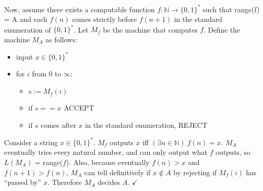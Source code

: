 \documentclass[11pt]{article}
\let\imp\rightarrow
\begin{document}
Now, assume there exists a computable function $f: \mathbb{N} \imp \{0,1\}^*$ such that range(f) = A and each $f(n)$ comes strictly before $f(n+1)$ in the standard enumeration of $\{0,1\}^*$.
Let $M_f$ be the machine that computes $f$.
Define the machine $M_A$ as follows:
\begin{itemize}
	\item input $x \in \{0,1\}^*$
	\item for $i$ from 0 to $\infty$:
	\begin{itemize}
		\item $s := M_f(i)$
		\item if $s == x$ ACCEPT
		\item if $s$ comes after $x$ in the standard enumeration, REJECT
	\end{itemize}
\end{itemize}

Consider a string $x \in \{0,1\}^*$.
$M_f$ outputs $x$ iff $(\exists n \in \mathbb{N})\ f(n) = x$.
$M_A$ eventually tries every natural number, and can only output what $f$ outputs, so $L(M_A)$ = range($f$).
Also, because eventually $f(n) > x$ and $f(n+1) > f(n)$, $M_A$ can tell definitively if $x \notin A$ by rejecting if $M_f(i)$ has ``passed by'' $x$.
Therefore $M_A$ decides $A$. $\checkmark$
\end{document}
